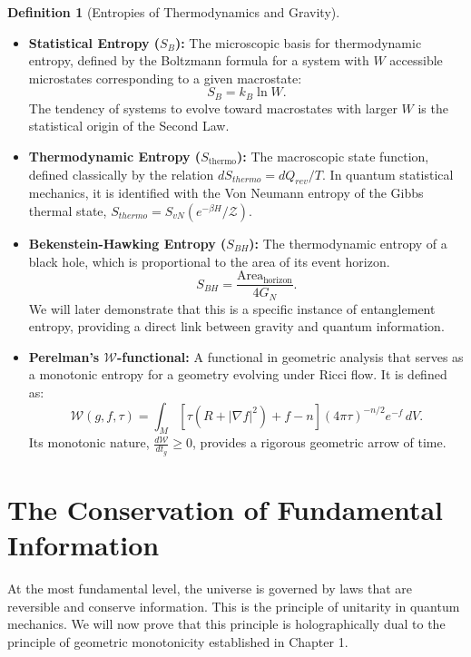 \documentclass[11pt, letterpaper]{report}
\theoremstyle{plain} %
\theoremstyle{definition} %
\newtheorem{definition}{Definition}[chapter]
\theoremstyle{remark} %
\begin{document}
\begin{definition}[Entropies of Thermodynamics and Gravity]~
\begin{itemize}
    \item \textbf{Statistical Entropy ($S_B$):} The microscopic basis for thermodynamic entropy, defined by the Boltzmann formula for a system with $W$ accessible microstates corresponding to a given macrostate:
    \begin{equation}
        S_B = k_B \ln W.
    \end{equation}
    The tendency of systems to evolve toward macrostates with larger $W$ is the statistical origin of the Second Law.

    \item \textbf{Thermodynamic Entropy ($S_{\text{thermo}}$):} The macroscopic state function, defined classically by the relation $dS_{thermo} = dQ_{rev}/T$. In quantum statistical mechanics, it is identified with the Von Neumann entropy of the Gibbs thermal state, $S_{thermo} = S_{vN}(e^{-\beta H}/\mathcal{Z})$.

    \item \textbf{Bekenstein-Hawking Entropy ($S_{BH}$):} The thermodynamic entropy of a black hole, which is proportional to the area of its event horizon.
    \begin{equation}
        S_{BH} = \frac{\text{Area}_{\text{horizon}}}{4G_N}.
    \end{equation}
    We will later demonstrate that this is a specific instance of entanglement entropy, providing a direct link between gravity and quantum information.

    \item \textbf{Perelman's $\mathcal{W}$-functional:} A functional in geometric analysis that serves as a monotonic entropy for a geometry evolving under Ricci flow. It is defined as:
    \begin{equation}
        \mathcal{W}(g,f,\tau) = \int_M \left[ \tau(R + |\nabla f|^2) + f - n \right] (4\pi\tau)^{-n/2} e^{-f} \, dV.
\label{eq:perelman_W_entropy_revised} %
    \end{equation}
    Its monotonic nature, $\frac{d\mathcal{W}}{dt_g} \ge 0$, provides a rigorous geometric arrow of time.
\end{itemize}
\end{definition}

\section{The Conservation of Fundamental Information}
\label{sec:info_conservation}
At the most fundamental level, the universe is governed by laws that are reversible and conserve information. This is the principle of unitarity in quantum mechanics. We will now prove that this principle is holographically dual to the principle of geometric monotonicity established in Chapter 1.
\end{document}
